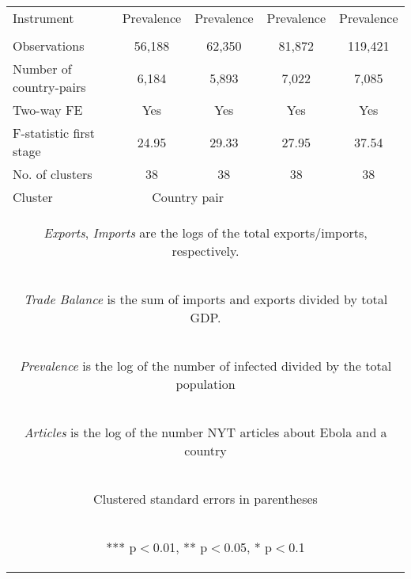 \documentclass{article}
\begin{document}
\begin{table}[htbp]
{\begin{tabular}{lcccc}
Instrument & Prevalence & Prevalence & Prevalence & Prevalence \\
\vspace{4pt} & \begin{footnotesize}\end{footnotesize} & \begin{footnotesize}\end{footnotesize} & \begin{footnotesize}\end{footnotesize} & \begin{footnotesize}\end{footnotesize} \\
Observations & 56,188 & 62,350 & 81,872 & 119,421 \\
Number of country-pairs & 6,184 & 5,893 & 7,022 & 7,085 \\
Two-way FE & Yes & Yes & Yes & Yes \\
F-statistic first stage & 24.95 & 29.33 & 27.95 & 37.54 \\
No. of clusters & 38 & 38 & 38 & 38 \\ 
Cluster & \multicolumn{2}{c}{Country pair} \\ \hline
\multicolumn{5}{c}{\begin{footnotesize} \textit{Exports}, \textit{Imports} are the logs of the total exports/imports, respectively.  \end{footnotesize} }\\
\multicolumn{5}{c}{\begin{footnotesize} \textit{Trade Balance} is the sum of imports and exports divided by total GDP. \end{footnotesize} }\\
\multicolumn{5}{c}{\begin{footnotesize} \textit{Prevalence} is the log of the number of infected divided by the total population \end{footnotesize} }\\
\multicolumn{5}{c}{\begin{footnotesize} \textit{Articles} is the log of the number NYT articles about Ebola and a country \end{footnotesize} }\\
\multicolumn{5}{c}{\begin{footnotesize} Clustered standard errors in parentheses\end{footnotesize}} \\
\multicolumn{5}{c}{\begin{footnotesize} *** p$<$0.01, ** p$<$0.05, * p$<$0.1\end{footnotesize}} \\
\end{tabular}
}
\end{table}
\end{document}
